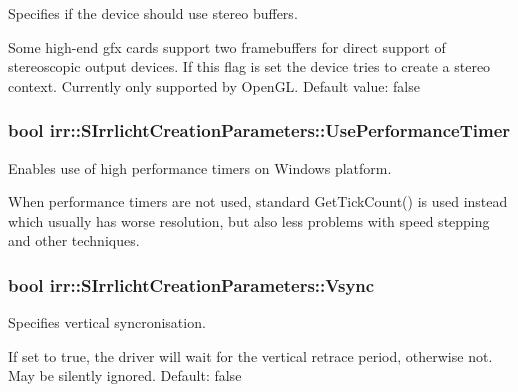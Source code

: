 Specifies if the device should use stereo buffers. 

Some high-\/end gfx cards support two framebuffers for direct support of stereoscopic output devices. If this flag is set the device tries to create a stereo context. Currently only supported by Open\+GL. Default value\+: false 
\subsubsection[{\texorpdfstring{Use\+Performance\+Timer}{UsePerformanceTimer}}]{\setlength{\rightskip}{0pt plus 5cm}bool irr\+::\+S\+Irrlicht\+Creation\+Parameters\+::\+Use\+Performance\+Timer}\hypertarget{structirr_1_1SIrrlichtCreationParameters_a5bb2ea5e72eb07a049b1b7c707f405ef}{}\label{structirr_1_1SIrrlichtCreationParameters_a5bb2ea5e72eb07a049b1b7c707f405ef}


Enables use of high performance timers on Windows platform. 

When performance timers are not used, standard Get\+Tick\+Count() is used instead which usually has worse resolution, but also less problems with speed stepping and other techniques. 
\subsubsection[{\texorpdfstring{Vsync}{Vsync}}]{\setlength{\rightskip}{0pt plus 5cm}bool irr\+::\+S\+Irrlicht\+Creation\+Parameters\+::\+Vsync}\hypertarget{structirr_1_1SIrrlichtCreationParameters_a33b07682f12db0d2c2c3a7bf74f64387}{}\label{structirr_1_1SIrrlichtCreationParameters_a33b07682f12db0d2c2c3a7bf74f64387}


Specifies vertical syncronisation. 

If set to true, the driver will wait for the vertical retrace period, otherwise not. May be silently ignored. Default\+: false 
